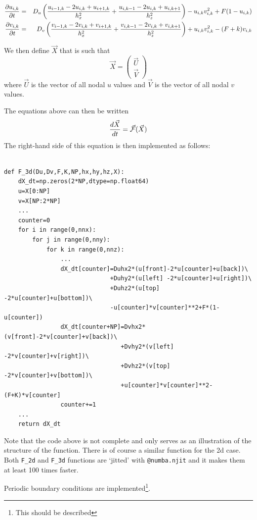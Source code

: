 \begin{eqnarray}
\frac{\partial u_{i,k}}{\partial t} 
&=& D_u 
\left(
\frac{u_{i-1,k}-2u_{i,k}+u_{i+1,k}}{h_x^2} + 
\frac{u_{i,k-1}-2u_{i,k}+u_{i,k+1}}{h_z^2} 
\right)
- u_{i,k}v_{i,k}^2 + F(1-u_{i,k}) 
\nonumber\\
\frac{\partial v_{i,k}}{\partial t} &=& D_v 
\left(
\frac{v_{i-1,k}-2v_{i,k}+v_{i+1,k}}{h_x^2} + 
\frac{v_{i,k-1}-2v_{i,k}+v_{i,k+1}}{h_z^2} 
\right) 
+ u_{i,k}v_{i,k}^2 - (F+k)v_{i,k}
\end{eqnarray}

We then define $\vec{X}$ that is such that 
\[
\vec{X} = 
\left(
\begin{array}{c}
\vec{U} \\ \vec{V}
\end{array}
\right)
\] 
where $\vec{U}$ is the vector of all nodal $u$ values and 
$\vec{V}$ is the vector of all nodal $v$ values.

The equations above can then be written 
\[
\frac{d\vec{X}}{dt} 
= \vec{\cal F} (\vec{X})
\]
The right-hand side of this equation is then implemented as follows:
\begin{lstlisting}

def F_3d(Du,Dv,F,K,NP,hx,hy,hz,X):
    dX_dt=np.zeros(2*NP,dtype=np.float64)
    u=X[0:NP]
    v=X[NP:2*NP]
    ...
    counter=0
    for i in range(0,nnx):
        for j in range(0,nny):
            for k in range(0,nnz):
                ... 
                dX_dt[counter]=Duhx2*(u[front]-2*u[counter]+u[back])\
                              +Duhy2*(u[left] -2*u[counter]+u[right])\
                              +Duhz2*(u[top]  -2*u[counter]+u[bottom])\
                              -u[counter]*v[counter]**2+F*(1-u[counter])
                dX_dt[counter+NP]=Dvhx2*(v[front]-2*v[counter]+v[back])\
                                 +Dvhy2*(v[left] -2*v[counter]+v[right])\
                                 +Dvhz2*(v[top]  -2*v[counter]+v[bottom])\
                                 +u[counter]*v[counter]**2-(F+K)*v[counter]
                counter+=1
    ...
    return dX_dt
\end{lstlisting}
Note that the code above is not complete and only serves as an 
illustration of the structure of the function.
There is of course a similar function for the 2d case.
Both \lstinline{F_2d} and \lstinline{F_3d} functions are `jitted' with
\lstinline{@numba.njit} and it makes them at least 100 times faster.

Periodic boundary conditions are implemented\footnote{This should be described}.

